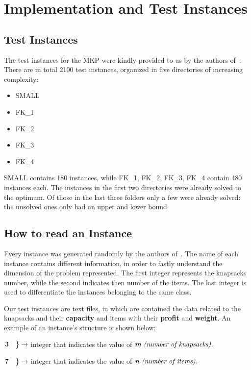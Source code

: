 \chapter{Implementation and Test Instances}

\section{Test Instances}
The test instances for the MKP were kindly provided to us by the authors of~\cite{mkp:2019}.\\
There are in total 2100 test instances, organized in
five directories of increasing complexity:
\begin{itemize}
    \item SMALL
    \item FK\_1
    \item FK\_2
    \item FK\_3
    \item FK\_4
\end{itemize}
SMALL contains 180 instances, while FK\_1, FK\_2, FK\_3, FK\_4 contain 480 instances each.
The instances in the first two directories were already solved to the optimum.
Of those in the last three folders only a few were already solved: the unsolved
ones only had an upper and lower bound.
\newpage
\section{How to read an Instance}
Every instance was generated randomly by the authors of~\cite{mkp:2019}.
The name of each instance contains different information, in order to fastly understand the dimension of the problem represented.
The first integer represents the knapsacks number, while the second indicates then number of the items.
The last integer is used to differentiate the instances belonging to the same class.


Our test instances are text files, in which are contained the data related to the knapsacks and their \textbf{capacity} and items with their \textbf{profit} and \textbf{weight}. An example of an instance's structure is shown below:

	\begin{flushleft} 
		$\begin{rcases*}
			3 \quad
		\end{rcases*} \rightarrow $ integer that indicates the value of $ \textit{\textbf{m} (number of knapsacks).}$
	\end{flushleft}
	\begin{flushleft}
		$\begin{rcases*}
			7 \quad
		\end{rcases*} \rightarrow $ integer that indicates the value of $ \textit{\textbf{n} (number of items).}$
	\end{flushleft}

